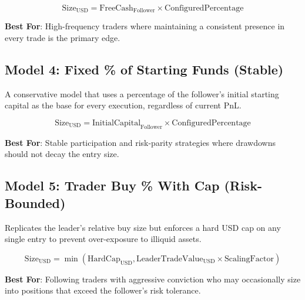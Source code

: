 \[
\text{Size}_{\text{USD}} = \text{FreeCash}_{\text{Follower}} \times \text{ConfiguredPercentage}
\]

\textbf{Best For}: High-frequency traders where maintaining a consistent presence in every trade is the primary edge.

\subsection{Model 4: Fixed \% of Starting Funds (Stable)}

A conservative model that uses a percentage of the follower's initial starting capital as the base for every execution, regardless of current PnL.

\[
\text{Size}_{\text{USD}} = \text{InitialCapital}_{\text{Follower}} \times \text{ConfiguredPercentage}
\]

\textbf{Best For}: Stable participation and risk-parity strategies where drawdowns should not decay the entry size.

\subsection{Model 5: Trader Buy \% With Cap (Risk-Bounded)}

Replicates the leader's relative buy size but enforces a hard USD cap on any single entry to prevent over-exposure to illiquid assets.

\[
\text{Size}_{\text{USD}} = \min\left( \text{HardCap}_{\text{USD}}, \text{LeaderTradeValue}_{\text{USD}} \times \text{ScalingFactor} \right)
\]

\textbf{Best For}: Following traders with aggressive conviction who may occasionally size into positions that exceed the follower's risk tolerance.
